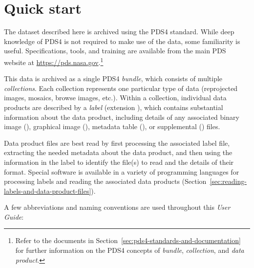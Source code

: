 
\section{Quick start}
\label{sec:quick-start}

The dataset described here is archived using the PDS4 standard. While deep knowledge of PDS4 is not required to make use of the data, some familiarity is useful. Specifications, tools, and training are available from the main PDS website at \href{https://pds.nasa.gov}{https://pds.nasa.gov}.\footnote{Refer to the documents in Section~\ref{sec:pds4-standards-and-documentation} for further information on the PDS4 concepts of \textit{bundle}, \textit{collection}, and \textit{data product}.}

This data is archived as a single PDS4 \textit{bundle}, which consists of multiple \textit{collections}. Each collection represents one particular type of data (reprojected images, mosaics, browse images, etc.). Within a collection, individual data products are described by a \textit{label} (extension ), which contains substantial information about the data product, including details of any associated binary image (), graphical image (), metadata table (), or supplemental () files.

Data product files are best read by first processing the associated label file, extracting the needed metadata about the data product, and then using the information in the label to identify the file(s) to read and the details of their format. Special software is available in a variety of programming languages for processing labels and reading the associated data products (Section~\ref{sec:reading-labels-and-data-product-files}).

A few abbreviations and naming conventions are used throughout this
\textit{User Guide}:

